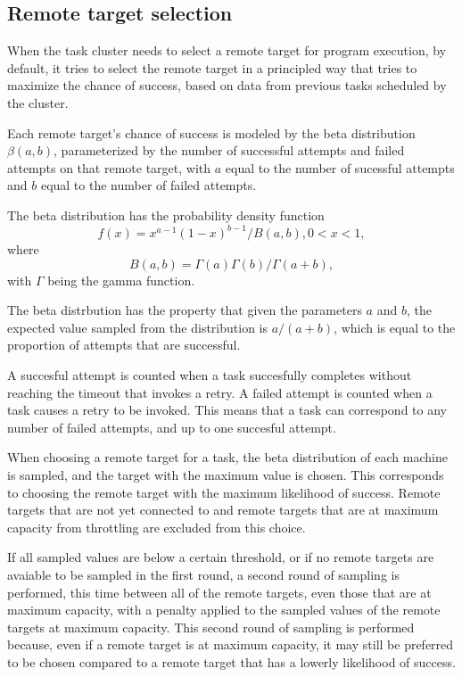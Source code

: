 \documentclass[twoside]{report}
\newcommand{\todoi}[1]{\todo[inline, color=blue!20]{TODO: {#1}}}
\begin{document}
\subsection{Remote target selection}
When the task cluster needs to select a remote target for program execution, by default, it tries to select the remote target in a principled way that tries to maximize the chance of success, based on data from previous tasks scheduled by the cluster.

Each remote target's chance of success is modeled by the beta distribution $\beta(a, b)$, parameterized by the number of successful attempts and failed attempts on that remote target, with $a$ equal to the number of sucessful attempts and $b$ equal to the number of failed attempts.

The beta distribution has the probability density function
$$ f(x) = x^{a-1}(1-x)^{b-1} / B(a, b), 0 < x < 1,$$
where
$$ B(a, b) = \Gamma(a)\Gamma(b) / \Gamma(a+b), $$
with $\Gamma$ being the gamma function.

The beta distrbution has the property that given the parameters $a$ and $b$, the expected value sampled from the distribution is $a/(a+b)$, which is equal to the proportion of attempts that are successful.
\todoi{Do I need to cite the beta distribution?}

A succesful attempt is counted when a task succesfully completes without reaching the timeout that invokes a retry.
A failed attempt is counted when a task causes a retry to be invoked.
This means that a task can correspond to any number of failed attempts, and up to one succesful attempt.

When choosing a remote target for a task, the beta distribution of each machine is sampled, and the target with the maximum value is chosen.
This corresponds to choosing the remote target with the maximum likelihood of success.
Remote targets that are not yet connected to and remote targets that are at maximum capacity from throttling are excluded from this choice.

If all sampled values are below a certain threshold, or if no remote targets are avaiable to be sampled in the first round, a second round of sampling is performed, this time between all of the remote targets, even those that are at maximum capacity, with a penalty applied to the sampled values of the remote targets at maximum capacity.
This second round of sampling is performed because, even if a remote target is at maximum capacity, it may still be preferred to be chosen compared to a remote target that has a lowerly likelihood of success.
\end{document}
